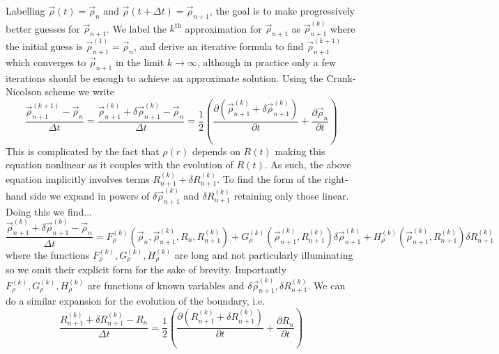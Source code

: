 \documentclass[11pt,twoside]{report}
\begin{document}
Labelling $\vec{\rho}(t) = \vec{\rho}_n$ and $\vec{\rho}(t + \Delta t) = \vec{\rho}_{n+1}$, the goal is to make progressively better guesses for $\vec{\rho}_{n+1}$.
We label the $k^\textrm{th}$ approximation for $\vec{\rho}_{n+1}$ as $\vec{\rho}_{n+1}^{(k)}$ where the initial guess is $\vec{\rho}_{n+1}^{(1)} = \vec{\rho}_n$, and derive an iterative formula to find $\vec{\rho}_{n+1}^{(k+1)}$ which converges to $\vec{\rho}_{n+1}$ in the limit $k \to \infty$, although in practice only a few iterations should be enough to achieve an approximate solution.
Using the Crank-Nicolson scheme we write
\begin{equation}
  \frac{\vec{\rho}_{n+1}^{(k+1)} - \vec{\rho}_n}{\Delta t}
  =
  \frac{\vec{\rho}_{n+1}^{(k)} + \delta \vec{\rho}_{n+1}^{(k)} - \vec{\rho}_n}{\Delta t}
  =
  \frac{1}{2}
  \left(
  \frac{\partial (\vec{\rho}_{n+1}^{(k)} + \delta \vec{\rho}_{n+1}^{(k)})}{\partial t}
  +
  \frac{\partial \vec{\rho}_n}{\partial t}
  \right)
\end{equation}
This is complicated by the fact that $\rho(r)$ depends on $R(t)$ making this equation nonlinear as it couples with the evolution of $R(t)$.
As such, the above equation implicitly involves terms $R_{n+1}^{(k)} + \delta R_{n+1}^{(k)}$.
To find the form of the right-hand side we expand in powers of $\delta \vec{\rho}_{n+1}^{(k)}$ and $\delta R_{n+1}^{(k)}$ retaining only those linear.
Doing this we find...
\begin{equation}
  \frac{\vec{\rho}_{n+1}^{(k)} + \delta \vec{\rho}_{n+1}^{(k)} - \vec{\rho}_n}{\Delta t}
  =
  F_\rho^{(k)} (\vec{\rho}_n, \vec{\rho}_{n+1}^{(k)}, R_n, R_{n+1}^{(k)}) +
  G_\rho^{(k)} (\vec{\rho}_{n+1}^{(k)}, R_{n+1}^{(k)}) \delta \vec{\rho}_{n+1}^{(k)} +
  H_\rho^{(k)} (\vec{\rho}_{n+1}^{(k)}, R_{n+1}^{(k)}) \delta R_{n+1}^{(k)}
\end{equation}
where the functions $F_\rho^{(k)},G_\rho^{(k)},H_\rho^{(k)}$ are long and not particularly illuminating so we omit their explicit form for the sake of brevity.
Importantly $F_\rho^{(k)},G_\rho^{(k)},H_\rho^{(k)}$ are functions of known variables and $\delta \vec{\rho}_{n+1}^{(k)}, \delta R_{n+1}^{(k)}$.
We can do a similar expansion for the evolution of the boundary, i.e.\
\begin{equation}\label{eq:discrete-evolution-rho}
  \frac{R_{n+1}^{(k)} + \delta R_{n+1}^{(k)} - R_n}{\Delta t}
  =
  \frac{1}{2}
  \left(
  \frac{\partial (R_{n+1}^{(k)} + \delta R_{n+1}^{(k)})}{\partial t}
  +
  \frac{\partial R_n}{\partial t}
  \right)
\end{equation}
\end{document}
